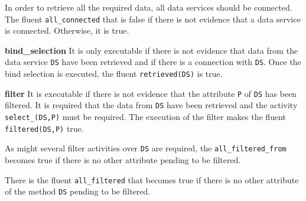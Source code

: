 
\vspace*{0.25cm}
In order to retrieve all the required data, all data services should be connected. The fluent \texttt{all_connected} that is false if there is not evidence that a data service is connected. Otherwise, it is true.

%


\vspace*{0.25cm}
\textbf{bind_selection} It is only executable if there is not evidence that data from the data service \texttt{DS} have been retrieved and if there is a connection with \texttt{DS}. Once the bind selection is executed, the fluent \texttt{retrieved(DS)} is true. 

      
%


\vspace*{0.25cm}
\textbf{filter} It is executable if there is not evidence that the attribute \texttt{P} of \texttt{DS} has been filtered. It is required that the data from \texttt{DS} have been retrieved and the activity \texttt{select_(DS,P)} must be required. The execution of the filter makes the fluent \texttt{filtered(DS,P)} true.

%


\vspace*{0.25cm}
As might several filter activities over \texttt{DS} are required, the \texttt{all_filtered_from} becomes true if there is no other attribute pending to be filtered.

%


\vspace*{0.25cm}
There is the fluent \texttt{all\_filtered} that becomes true if there is no other attribute of the method \texttt{DS} pending to be filtered.

